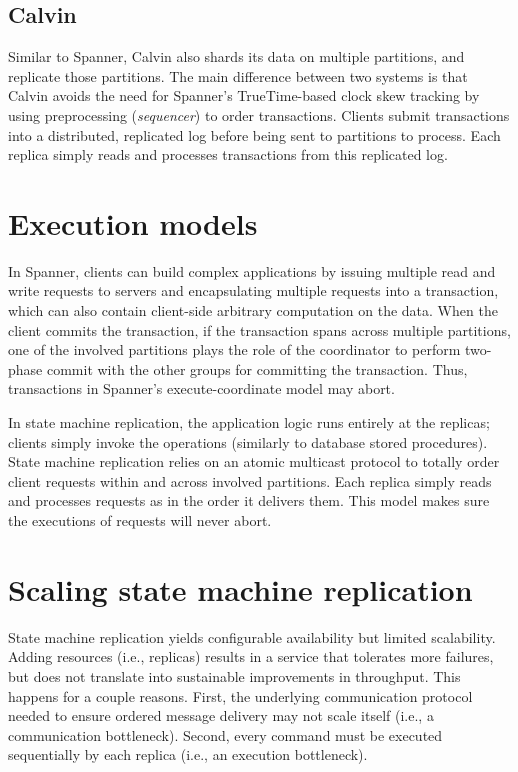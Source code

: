 \subsection{Calvin}
Similar to Spanner, Calvin also shards its data on multiple partitions, and
replicate those partitions. The main difference between two systems is that
Calvin avoids the need for Spanner’s TrueTime-based clock skew tracking by using
preprocessing (\emph{sequencer}) to order transactions. Clients submit
transactions into a distributed, replicated log before being sent to partitions
to process. Each replica simply reads and processes transactions from this
replicated log.


\section{Execution models}

In Spanner, clients can build complex applications by issuing multiple read and
write requests to servers and encapsulating multiple requests into a
transaction, which can also contain client-side arbitrary computation on the
data. When the client commits the transaction, if the transaction spans across
multiple partitions, one of the involved partitions plays the role of the
coordinator to perform two-phase commit with the other groups for committing the
transaction. Thus, transactions in Spanner’s execute-coordinate model may abort.

In state machine replication, the application logic runs entirely at the
replicas; clients simply invoke the operations (similarly to database stored
procedures). State machine replication relies on an atomic multicast protocol to
totally order client requests within and across involved partitions. Each
replica simply reads and processes requests as in the order it delivers them.
This model makes sure the executions of requests will never abort.


\section{Scaling state machine replication}

State machine replication yields configurable availability but limited
scalability. Adding resources (i.e., replicas) results in a service that
tolerates more failures, but does not translate into sustainable improvements in
throughput. This happens for a couple reasons. First, the underlying
communication protocol needed to ensure ordered message delivery may not scale
itself (i.e., a communication bottleneck). Second, every command must be
executed sequentially by each replica (i.e., an execution bottleneck).

